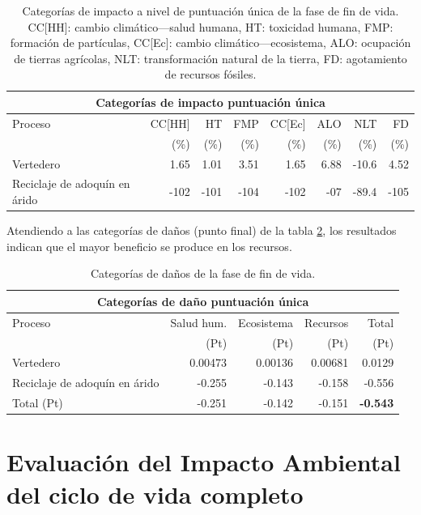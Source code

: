 \begin{table}[!htb]
\centering
\begin{tabular}{p{4cm}rrrrrrr}
\toprule
\multicolumn{8}{c}{Categorías de impacto puntuación única}\\
\midrule
Proceso & CC[HH] & HT & FMP & CC[Ec] & ALO & NLT & FD\\
 &  (\%) & (\%) & (\%) & (\%) & (\%) & (\%) & (\%)\\
\midrule
Vertedero & 1.65 & 1.01 & 3.51 & 1.65 & 6.88 & -10.6 & 4.52\\
Reciclaje de adoquín en árido & -102 & -101 & -104 & -102 & -07 & -89.4 & -105\\
\bottomrule
\end{tabular}
\caption[Categorías de impacto a nivel de puntuación única de la fase de fin de vida.]{Categorías de impacto a nivel de puntuación única de la fase de fin de vida. CC[HH]: cambio climático—salud humana, HT: toxicidad humana, FMP: formación de partículas, CC[Ec]: cambio climático—ecosistema, ALO: ocupación de tierras agrícolas, NLT: transformación natural de la tierra, FD: agotamiento de recursos fósiles.}
\label{categoriasimpactofdvpuntunica}
\end{table}

Atendiendo a las categorías de daños (punto final) de la tabla \ref{categoriasdanosfdv}, los resultados indican que el mayor beneficio se produce en los recursos.

\begin{table}[!htb]
\centering
\begin{tabular}{p{6cm}rrrr}
\toprule
\multicolumn{5}{c}{Categorías de daño puntuación única}\\
\midrule
Proceso & Salud hum. & Ecosistema & Recursos & Total\\
 & (Pt) & (Pt) & (Pt) & (Pt)\\
\midrule
Vertedero & 0.00473 & 0.00136 & 0.00681 & 0.0129\\
Reciclaje de adoquín en árido & -0.255 & -0.143 & -0.158 & -0.556\\
\midrule
Total (Pt) & -0.251 & -0.142 & -0.151 & \textbf{-0.543}\\
\bottomrule
\end{tabular}
\caption{Categorías de daños de la fase de fin de vida.}
\label{categoriasdanosfdv}
\end{table}

\section{Evaluación del Impacto Ambiental del ciclo de vida completo}

